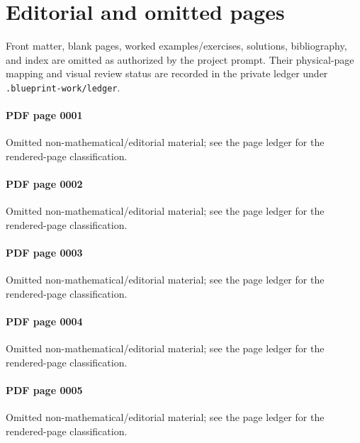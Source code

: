 \section*{Editorial and omitted pages}\label{mcrt-omitted-pages}\uses{}Front matter, blank pages, worked examples/exercises, solutions, bibliography, and index are omitted as authorized by the project prompt. Their physical-page mapping and visual review status are recorded in the private ledger under \texttt{.blueprint-work/ledger}.\par
\paragraph{PDF page 0001}\uses{}\label{mcrt-omitted-p0001} Omitted non-mathematical/editorial material; see the page ledger for the rendered-page classification.\par
\paragraph{PDF page 0002}\uses{}\label{mcrt-omitted-p0002} Omitted non-mathematical/editorial material; see the page ledger for the rendered-page classification.\par
\paragraph{PDF page 0003}\uses{}\label{mcrt-omitted-p0003} Omitted non-mathematical/editorial material; see the page ledger for the rendered-page classification.\par
\paragraph{PDF page 0004}\uses{}\label{mcrt-omitted-p0004} Omitted non-mathematical/editorial material; see the page ledger for the rendered-page classification.\par
\paragraph{PDF page 0005}\uses{}\label{mcrt-omitted-p0005} Omitted non-mathematical/editorial material; see the page ledger for the rendered-page classification.\par
